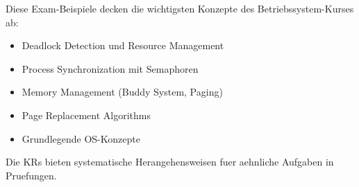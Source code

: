\begin{remark}
    Diese Exam-Beispiele decken die wichtigsten Konzepte des Betriebssystem-Kurses ab:
    \begin{itemize}
        \item Deadlock Detection und Resource Management
        \item Process Synchronization mit Semaphoren
        \item Memory Management (Buddy System, Paging)
        \item Page Replacement Algorithms
        \item Grundlegende OS-Konzepte
    \end{itemize}
    Die KRs bieten systematische Herangehensweisen fuer aehnliche Aufgaben in Pruefungen.
\end{remark}